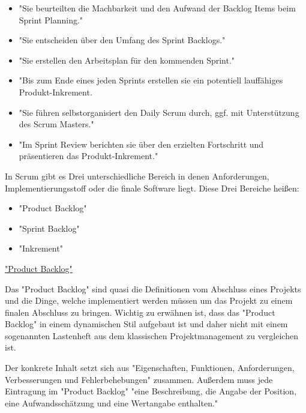 \begin{itemize}
    \item "Sie beurteilten die Machbarkeit und den Aufwand der Backlog Items beim Sprint Planning." \cite{Entwicklungsteam}
    \item "Sie entscheiden über den Umfang des Sprint Backlogs." \cite{Entwicklungsteam}
    \item "Sie erstellen den Arbeitsplan für den kommenden Sprint." \cite{Entwicklungsteam}
    \item "Bis zum Ende eines jeden Sprints erstellen sie ein potentiell lauffähiges Produkt-Inkrement. \cite{Entwicklungsteam}
    \item "Sie führen selbstorganisiert den Daily Scrum durch, ggf. mit Unterstützung des Scrum Masters." \cite{Entwicklungsteam}
    \item "Im Sprint Review berichten sie über den erzielten Fortschritt und präsentieren das Produkt-Inkrement." \cite{Entwicklungsteam}
\end{itemize}


In Scrum gibt es Drei unterschiedliche Bereich in denen Anforderungen, Implementierungsstoff oder die finale Software liegt. Diese Drei Bereiche heißen:

\begin{itemize}
    \item "Product Backlog"
    \item "Sprint Backlog"
    \item "Inkrement"
\end{itemize}

\cite{Scrum}

\underline{"Product Backlog"}

Das "Product Backlog" sind quasi die Definitionen vom Abschluss eines Projekts und die Dinge, welche implementiert werden müssen um das Projekt zu einem finalen Abschluss zu bringen. Wichtig zu erwähnen ist, dass das "Product Backlog" in einem dynamischen Stil aufgebaut ist und daher nicht mit einem sogenannten Lastenheft aus dem klassischen Projektmanagement zu vergleichen ist.

Der konkrete Inhalt setzt sich aus "Eigenschaften, Funktionen, Anforderungen, Verbesserungen und Fehlerbehebungen" \cite{ProductBacklog} zusammen.  Außerdem muss jede Eintragung im "Product Backlog" "eine Beschreibung, die Angabe der Position, eine Aufwandsschätzung und eine Wertangabe enthalten." \cite{ProductBacklog}

